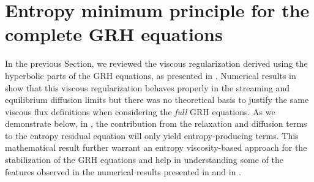 \documentclass[times,doublespace]{fldauth}%
\begin{document}
%
\section{Entropy minimum principle for the complete GRH equations}
\label{sec:VR_new}
%
In the previous Section, we  reviewed the viscous regularization derived using the hyperbolic parts of the GRH equations, as presented in \cite{our_jcp_radhy_paper}. 
Numerical results in \cite{our_jcp_radhy_paper} show that this viscous regularization 
behaves properly in the streaming and equilibrium diffusion limits but there was no theoretical basis to justify the same viscous flux definitions when considering the \emph{full} GRH equations. As we 
demonstrate below, in , the contribution from the relaxation and diffusion terms to the entropy residual equation will only 
yield entropy-producing terms.
This mathematical result further warrant an entropy viscosity-based approach for the stabilization of the GRH equations 
and help in understanding  some of the features observed in the numerical results presented in  and in \cite{our_jcp_radhy_paper}.
%
\end{document}
